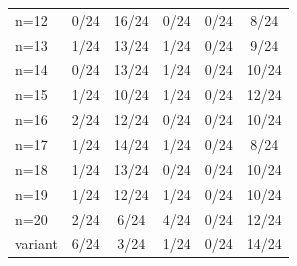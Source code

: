 \begin{tabular}{lccccc}
n=12 & \cellcolor[HTML]{FFFFFF} 0/24 & \cellcolor[HTML]{EA4646} 16/24 & \cellcolor[HTML]{9670BD} 0/24 & \cellcolor[HTML]{8FEB32} 0/24 & \cellcolor[HTML]{19C8C8} 8/24 \\
n=13 & \cellcolor[HTML]{FFFFFF} 1/24 & \cellcolor[HTML]{EA4646} 13/24 & \cellcolor[HTML]{9670BD} 1/24 & \cellcolor[HTML]{8FEB32} 0/24 & \cellcolor[HTML]{19C8C8} 9/24 \\
n=14 & \cellcolor[HTML]{FFFFFF} 0/24 & \cellcolor[HTML]{EA4646} 13/24 & \cellcolor[HTML]{9670BD} 1/24 & \cellcolor[HTML]{8FEB32} 0/24 & \cellcolor[HTML]{19C8C8} 10/24 \\
n=15 & \cellcolor[HTML]{FFFFFF} 1/24 & \cellcolor[HTML]{EA4646} 10/24 & \cellcolor[HTML]{9670BD} 1/24 & \cellcolor[HTML]{8FEB32} 0/24 & \cellcolor[HTML]{19C8C8} 12/24 \\
n=16 & \cellcolor[HTML]{FFFFFF} 2/24 & \cellcolor[HTML]{EA4646} 12/24 & \cellcolor[HTML]{9670BD} 0/24 & \cellcolor[HTML]{8FEB32} 0/24 & \cellcolor[HTML]{19C8C8} 10/24 \\
n=17 & \cellcolor[HTML]{FFFFFF} 1/24 & \cellcolor[HTML]{EA4646} 14/24 & \cellcolor[HTML]{9670BD} 1/24 & \cellcolor[HTML]{8FEB32} 0/24 & \cellcolor[HTML]{19C8C8} 8/24 \\
n=18 & \cellcolor[HTML]{FFFFFF} 1/24 & \cellcolor[HTML]{EA4646} 13/24 & \cellcolor[HTML]{9670BD} 0/24 & \cellcolor[HTML]{8FEB32} 0/24 & \cellcolor[HTML]{19C8C8} 10/24 \\
n=19 & \cellcolor[HTML]{FFFFFF} 1/24 & \cellcolor[HTML]{EA4646} 12/24 & \cellcolor[HTML]{9670BD} 1/24 & \cellcolor[HTML]{8FEB32} 0/24 & \cellcolor[HTML]{19C8C8} 10/24 \\
n=20 & \cellcolor[HTML]{FFFFFF} 2/24 & \cellcolor[HTML]{EA4646} 6/24 & \cellcolor[HTML]{9670BD} 4/24 & \cellcolor[HTML]{8FEB32} 0/24 & \cellcolor[HTML]{19C8C8} 12/24 \\
variant & \cellcolor[HTML]{FFFFFF} 6/24 & \cellcolor[HTML]{EA4646} 3/24 & \cellcolor[HTML]{9670BD} 1/24 & \cellcolor[HTML]{8FEB32} 0/24 & \cellcolor[HTML]{19C8C8} 14/24 \\
\bottomrule
\end{tabular}
